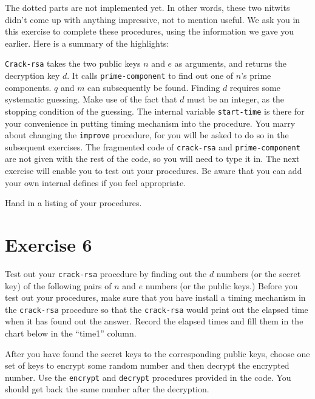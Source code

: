 The dotted parts are not implemented yet.  In other words, these two nitwits
didn't come up with anything impressive, not to mention useful.  We ask you
in this exercise to complete these procedures, using the information we gave
you earlier.  Here is a summary of the highlights:


{\tt Crack-rsa} takes the two public keys $n$ and $e$ as arguments, and
returns the decryption key $d$.  It calls {\tt prime-component} to find
out one of $n$'s prime
components.  $q$ and $m$ can subsequently be found.  Finding $d$ requires some
systematic guessing.  Make use of the fact that $d$ must be an integer,
as the stopping condition of the guessing.
The internal variable {\tt start-time} is there
for your convenience in putting timing mechanism into the procedure.  You
marry about changing the
{\tt improve} procedure, for you will be asked to do so in the subsequent
exercises.  The fragmented code of {\tt crack-rsa} and {\tt prime-component}
are not given with the rest of the code, so you will need to type it in.
The next exercise will enable you to test out your procedures.  Be aware
that you can add your own internal defines if you feel appropriate.

Hand in a listing of your procedures.

\section{Exercise 6}

Test out your {\tt crack-rsa} procedure by finding out the $d$ numbers (or
the
secret key) of the following pairs of $n$ and $e$ numbers (or the public keys.)
Before you test out your procedures, make sure that you have install a
timing mechanism in the
{\tt crack-rsa} procedure so that the {\tt crack-rsa} would print out the
elapsed time when it
has found out the answer.  Record the elapsed times and fill them in
the chart below in the ``time1'' column.

After you have found the secret keys to the corresponding public
keys, choose one set of keys to encrypt some random number and then
decrypt the encrypted number.  Use the {\tt encrypt} and {\tt decrypt}
procedures
provided in the code.  You should get back the same number after the
decryption.


